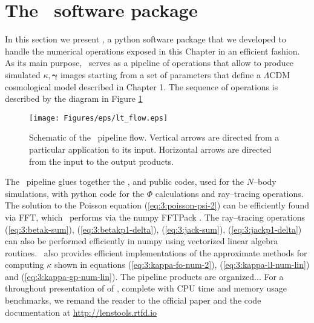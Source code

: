
\section{The \LT\, software package}
In this section we present \LT \citep{lenstools}, a {\sc python} software package that we developed to handle the numerical operations exposed in this Chapter in an efficient fashion. As its main purpose, \LT\, serves as a pipeline of operations that allow to produce simulated $\kappa,\pmb{\gamma}$ images starting from a set of parameters that define a $\Lambda$CDM cosmological model described in Chapter 1. The sequence of operations is described by the diagram in Figure \ref{fig:3:lt-flow}  
%
\begin{figure}
\begin{center}
\texttt{[image: Figures/eps/lt\_flow.eps]}
\end{center}
\caption{Schematic of the \LT\, pipeline flow. Vertical arrows are directed from a particular application to its input. Horizontal arrows are directed from the input to the output products.}
\label{fig:3:lt-flow}
\end{figure}
%
The \LT\, pipeline glues together the ,  and  public codes, used for the $N$--body simulations, with {\sc python} code for the $\Phi$ calculations and ray--tracing operations. The solution to the Poisson equation (\ref{eq:3:poisson-psi-2}) can be efficiently found via FFT, which \LT\, performs via the {\sc numpy} FFTPack \citep{scipy}. The ray--tracing operations (\ref{eq:3:betak-sum}), (\ref{eq:3:betakp1-delta}), (\ref{eq:3:jack-sum}), (\ref{eq:3:jackp1-delta}) can also be performed efficiently in {\sc numpy} using vectorized linear algebra routines. \LT\, also provides efficient implementations of the approximate methods for computing $\kappa$ shown in equations (\ref{eq:3:kappa-fo-num-2}), (\ref{eq:3:kappa-ll-num-lin}) and (\ref{eq:3:kappa-gp-num-lin}). The pipeline products are organized... For a throughout presentation of of \LT, complete with CPU time and memory usage benchmarks, we remand the reader to the official paper \citep{lenstools} and the code documentation at \url{http://lenstools.rtfd.io}     

